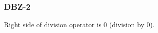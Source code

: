 \subsubsection{DBZ-2}\label{sec:error_code_dbz_2}

Right side of division operator is 0 (division by 0).


